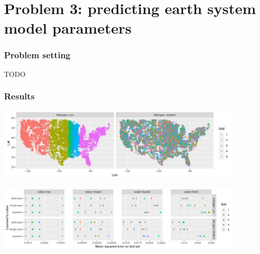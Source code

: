 \documentclass{beamer}
\begin{document}
\section{Problem 3: predicting earth system model parameters}

\begin{frame}
  \frametitle{Problem setting}
  TODO
\end{frame}

\begin{frame}
  \frametitle{Results}
  \centering
  \includegraphics[width=0.9\textwidth]{figure-proda-cv-data-map}

  \includegraphics[width=0.9\textwidth]{figure-proda-cv-some-out}
  
\end{frame}
 
\end{document}
